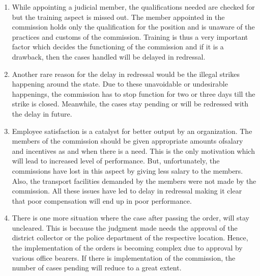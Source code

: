 \begin{multicols}{2}
\begin{enumerate}[label=$\bullet$]
\item While appointing a judicial member, the qualifications needed are checked for but the
training aspect is missed out. The member appointed in the commission holds only the
qualification for the position and is unaware of the practices and customs of the
commission. Training is thus a very important factor which decides the functioning of
the commission and if it is a drawback, then the cases handled will be delayed in
redressal.

\item Another rare reason for the delay in redressal would be the illegal strikes happening
around the state. Due to these unavoidable or undesirable happenings, the commission
has to stop function for two or three days till the strike is closed. Meanwhile, the cases
stay pending or will be redressed with the delay in future.

\item Employee satisfaction is a catalyst for better output by an organization. The members
of the commission should be given appropriate amounts ofsalary and incentives as and
when there is a need. This is the only motivation which will lead to increased level of
performance. But, unfortunately, the commissions have lost in this aspect by giving less
salary to the members. Also, the transport facilities demanded by the members were not made by the commission. All these issues have led to delay in redressal making it clear
that poor compensation will end up in poor performance.

\item There is one more situation where the case after passing the order, will stay uncleared.
This is because the judgment made needs the approval of the district collector or the
police department of the respective location. Hence, the implementation of the orders
is becoming complex due to approval by various office bearers. If there is
implementation of the commission, the number of cases pending will reduce to a great
extent.
\end{enumerate}

\vspace{-.3cm}


\end{multicols}
